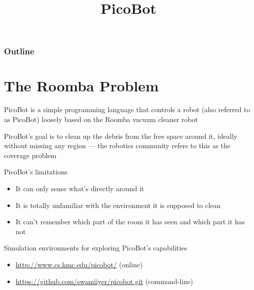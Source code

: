 \documentclass[8pt,a4paper,compress]{beamer}
\title{PicoBot}
\date{}
\begin{document}
\begin{frame}
\vfill
\titlepage
\end{frame}

\begin{frame}
\frametitle{Outline}
\tableofcontents
\end{frame}

\section{The Roomba Problem}
\begin{frame}[fragile]
\pause

PicoBot is a simple programming language that controls a robot (also referred to as PicoBot) loosely based on the Roomba vacuum cleaner robot

\pause
\bigskip

PicoBot's goal is to clean up the debris from the free space around it, ideally without missing any region --- the robotics community refers to this as the coverage problem

\pause
\bigskip

PicoBot's limitations
\begin{itemize}
\item It can only sense what's directly around it

\item It is totally unfamiliar with the environment it is supposed to clean

\item It can't remember which part of the room it has seen and which part it has not
\end{itemize}

\pause
\bigskip

Simulation environments for exploring PicoBot's capabilities
\begin{itemize}
\item \href{http://www.cs.hmc.edu/picobot/}{http://www.cs.hmc.edu/picobot/} (online)

\item \href{https://github.com/swamiiyer/picobot.git}{https://github.com/swamiiyer/picobot.git} (command-line)
\end{itemize}
\end{frame}
\end{document}
